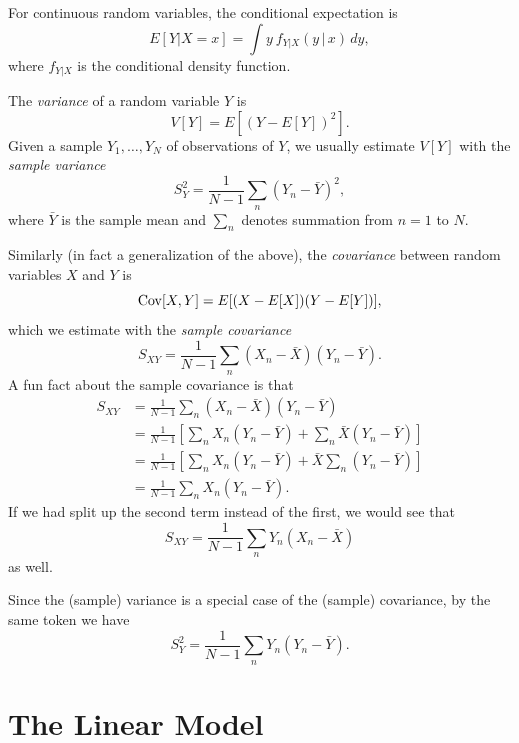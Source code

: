 \documentclass[
  12pt,
  oneside,openany]{book}
\begin{document}
For continuous random variables, the conditional expectation is
\begin{equation}
E[Y | X = x]
= \int y \: f_{Y|X} (y \,|\, x) \, dy,
\end{equation}
where \(f_{Y|X}\) is the conditional density function.

The \emph{variance} of a random variable \(Y\) is
\begin{equation}
V[Y] = E[(Y - E[Y])^2].
\end{equation}
Given a sample \(Y_1, \ldots, Y_N\) of observations of \(Y\), we usually estimate \(V[Y]\) with the \emph{sample variance}
\begin{equation}
S_Y^2 = \frac{1}{N-1} \sum_n (Y_n - \bar{Y})^2,
\end{equation}
where \(\bar{Y}\) is the sample mean and \(\sum_n\) denotes summation from \(n = 1\) to \(N\).

Similarly (in fact a generalization of the above), the \emph{covariance} between random variables \(X\) and \(Y\) is
\[
\mathop{\rm Cov}\nolimits[X, Y] = E[(X - E[X]) (Y - E[Y])],
\]
which we estimate with the \emph{sample covariance}
\begin{equation}
S_{XY} = \frac{1}{N-1} \sum_n (X_n - \bar{X}) (Y_n - \bar{Y}).
\end{equation}
A fun fact about the sample covariance is that
\begin{align}
S_{XY}
&= \frac{1}{N-1} \sum_n (X_n - \bar{X}) (Y_n - \bar{Y}) \\
&= \frac{1}{N-1} \left[ \sum_n X_n (Y_n - \bar{Y}) + \sum_n \bar{X} (Y_n - \bar{Y}) \right] \\
&= \frac{1}{N-1} \left[ \sum_n X_n (Y_n - \bar{Y}) + \bar{X} \sum_n (Y_n - \bar{Y}) \right] \\
&= \frac{1}{N-1} \sum_n X_n (Y_n - \bar{Y}).
\end{align}
If we had split up the second term instead of the first, we would see that
\[
S_{XY} = \frac{1}{N-1} \sum_n Y_n (X_n - \bar{X})
\]
as well.

Since the (sample) variance is a special case of the (sample) covariance, by the same token we have
\begin{equation}
S_Y^2 = \frac{1}{N-1} \sum_n Y_n (Y_n - \bar{Y}).
\end{equation}

\hypertarget{the-linear-model}{%
\section{The Linear Model}\label{the-linear-model}}
\end{document}
